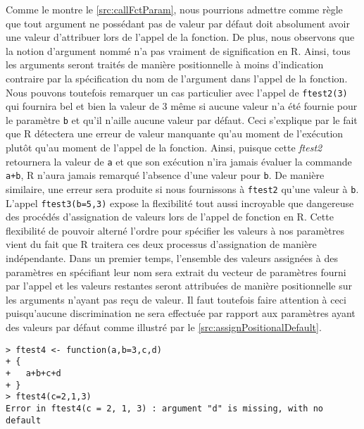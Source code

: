 \vspace{\baselineskip}
Comme le montre le \autoref{src:callFctParam}, nous pourrions admettre comme règle que tout argument ne possédant pas de valeur par défaut doit absolument avoir une valeur d'attribuer lors de l'appel de la fonction. De plus, nous observons que la notion d'argument nommé n'a pas vraiment de signification en R. Ainsi, tous les arguments seront traités de manière positionnelle à moins d'indication contraire par la spécification du nom de l'argument dans l'appel de la fonction. Nous pouvons toutefois remarquer un cas particulier avec l'appel de \texttt{ftest2(3)} qui fournira bel et bien la valeur de 3 même si aucune valeur n'a été fournie pour le paramètre \texttt{b} et qu'il n'aille aucune valeur par défaut. Ceci s'explique par le fait que R détectera une erreur de valeur manquante qu'au moment de l'exécution plutôt qu'au moment de l'appel de la fonction. Ainsi, puisque cette \emph{ftest2} retournera la valeur de \texttt{a} et que son exécution n'ira jamais évaluer la commande \texttt{a+b}, R n'aura jamais remarqué l'absence d'une valeur pour \texttt{b}. De manière similaire, une erreur sera produite si nous fournissons à \texttt{ftest2} qu'une valeur à \texttt{b}. L'appel \texttt{ftest3(b=5,3)} expose la flexibilité tout aussi incroyable que dangereuse des procédés d'assignation de valeurs lors de l'appel de fonction en R. Cette flexibilité de pouvoir alterné l'ordre pour spécifier les valeurs à nos paramètres vient du fait que R traitera ces deux processus d'assignation de manière indépendante. Dans un premier temps, l'ensemble des valeurs assignées à des paramètres en spécifiant leur nom sera extrait du vecteur de paramètres fourni par l'appel et les valeurs restantes seront attribuées de manière positionnelle sur les arguments n'ayant pas reçu de valeur. Il faut toutefois faire attention à ceci puisqu’aucune discrimination ne sera effectuée par rapport aux paramètres ayant des valeurs par défaut comme illustré par le \autoref{src:assignPositionalDefault}.

\begin{lstlisting}[caption = L'assignation et les valeurs par défaut,label=src:assignPositionalDefault]
> ftest4 <- function(a,b=3,c,d)
+ {
+   a+b+c+d
+ }
> ftest4(c=2,1,3)
Error in ftest4(c = 2, 1, 3) : argument "d" is missing, with no default
\end{lstlisting}

